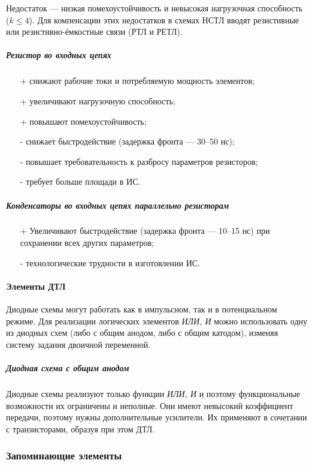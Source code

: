\documentclass[10pt,a4paper,titlepage]{article}
\begin{document}
Недостаток --- низкая помехоустойчивость и невысокая нагрузочная способность ($k \leqslant 4$).
Для компенсации этих недостатков в схемах НСТЛ вводят резистивные или резистивно-ёмкостные связи (РТЛ и РЕТЛ).

\subparagraph{Резистор во входных цепях}
\begin{itemize}
\item[+] снижают рабочие токи и потребляемую мощность элементов;
\item[+] увеличивают нагрузочную способность;
\item[+] повышают помехоустойчивость;
\item[-] снижает быстродействие (задержка фронта --- 30--50 нс);
\item[-] повышает требовательность к разбросу параметров резисторов;
\item[-] требует больше площади в ИС.
\end{itemize}

\subparagraph{Конденсаторы во входных цепях параллельно резисторам}
\begin{itemize}
\item[+] Увеличивают быстродействие (задержка фронта --- 10--15 нс) при сохранении всех других параметров;
\item[-] технологические трудности в изготовлении ИС.
\end{itemize}


\paragraph{Элементы ДТЛ}

Диодные схемы могут работать как в импульсном, так и в потенциальном режиме.
Для реализации логических элементов \textit{ИЛИ, И} можно использовать одну из диодных схем (либо с общим анодом, либо с общим катодом), изменяя систему задания двоичной переменной.

\subparagraph{Диодная схема с общим анодом}

Диодные схемы реализуют только функции \textit{ИЛИ, И} и поэтому функциональные возможности их ограничены и неполные.
Они имеют невысокий коэффициент передачи, поэтому нужны дополнительные усилители.
Их применяют в сочетании с транзисторами, образуя при этом ДТЛ.

\subsubsection{Запоминающие элементы}
\end{document}

